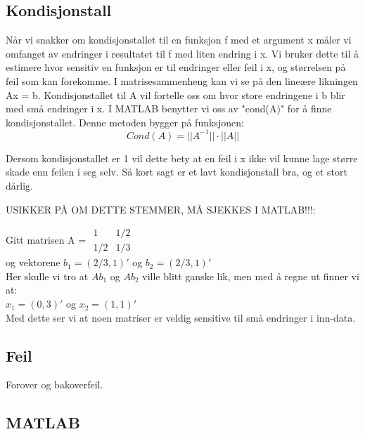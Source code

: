  \subsection{Kondisjonstall}
Når vi snakker om kondisjonstallet til en funksjon f med et argument x måler vi omfanget av endringer i resultatet til f med liten endring i x. Vi bruker dette til å estimere hvor sensitiv en funksjon er til endringer eller feil i x, og størrelsen på feil som kan forekomme. I matrisesammenheng kan vi se på den lineære likningen Ax = b. Kondisjonstallet til A vil fortelle oss om hvor store endringene i b blir med små endringer i x. I MATLAB benytter vi oss av "cond(A)" for å finne kondisjonstallet. Denne metoden bygger på funksjonen:
 \
 \begin{equation}
 Cond(A) = ||A^{-1}|| \cdot ||A||
 \end{equation}
 
Dersom kondisjonstallet er 1 vil dette bety at en feil i x ikke vil kunne lage større skade enn feilen i seg selv. Så kort sagt er et lavt kondisjonstall bra, og et stort dårlig. 

USIKKER PÅ OM DETTE STEMMER, MÅ SJEKKES I MATLAB!!!:

Gitt matrisen A = $\begin{matrix}
 
	1 & 1/2\\
	1/2 & 1/3
	
\end{matrix}$
\\
og vektorene $b_1 = (2/3, 1)'$ og $b_2 = (2/3, 1)'$
\\Her skulle vi tro at $Ab_1$ og $Ab_2$ ville blitt ganske lik, men med å regne ut finner vi at:\\$x_1 = (0, 3)'$ og $x_2 = (1, 1)'$
\\Med dette ser vi at noen matriser er veldig sensitive til små endringer i inn-data.

\subsection{Feil}
Forover og bakoverfeil.
 
\subsection{MATLAB}
